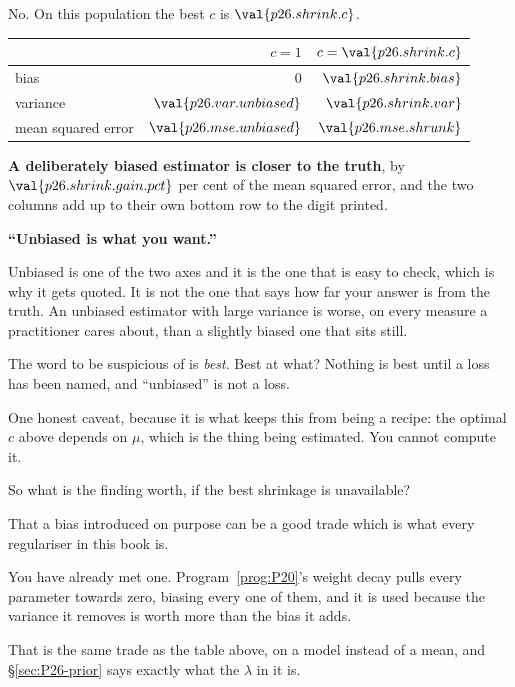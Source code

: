 \begin{fr}
\begin{ansblock}
No. On this population the best $c$ is $\val{p26.shrink.c}$.
\end{ansblock}

\begin{center}
\begin{tabular}{lrr}
\toprule
& $c = 1$ & $c = \val{p26.shrink.c}$ \\
\midrule
bias & $0$ & $\val{p26.shrink.bias}$ \\
variance & $\val{p26.var.unbiased}$ & $\val{p26.shrink.var}$ \\
mean squared error & $\val{p26.mse.unbiased}$ & $\val{p26.mse.shrunk}$ \\
\bottomrule
\end{tabular}
\end{center}

\textbf{A deliberately biased estimator is closer to the truth}, by
$\val{p26.shrink.gain.pct}$ per cent of the mean squared error, and the two
columns add up to their own bottom row to the digit printed.
\end{fr}

\begin{fr}
\begin{trapbox}
\textbf{\enquote{Unbiased is what you want.}}

Unbiased is one of the two axes and it is the one that is easy to check,
which is why it gets quoted. It is not the one that says how far your answer
is from the truth. An unbiased estimator with large variance is worse, on
every measure a practitioner cares about, than a slightly biased one that
sits still.

The word to be suspicious of is \emph{best}. Best at what? Nothing is best
until a loss has been named, and \enquote{unbiased} is not a loss.
\end{trapbox}

One honest caveat, because it is what keeps this from being a recipe: the
optimal $c$ above depends on $\mu$, which is the thing being estimated. You
cannot compute it.

So what is the finding worth, if the best shrinkage is unavailable?
\dotline
\nextframe
\end{fr}

\begin{fr}
\begin{ansblock}
That a bias introduced on purpose can be a good trade \dash{} which is what
every regulariser in this book is.
\end{ansblock}

You have already met one. Program~\ref{prog:P20}'s weight decay pulls every
parameter towards zero, biasing every one of them, and it is used because the
variance it removes is worth more than the bias it adds.

That is the same trade as the table above, on a model instead of a mean, and
\S\ref{sec:P26-prior} says exactly what the $\lambda$ in it is.
\end{fr}

